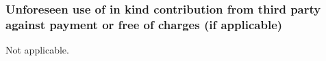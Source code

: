 \subsubsection{Unforeseen use of in kind contribution from third party against payment or
  free of charges (if applicable)}

 Not applicable. 

